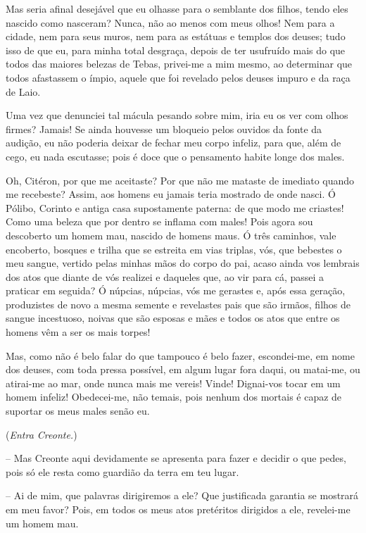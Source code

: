 Mas seria afinal desejável que eu olhasse para o semblante dos filhos,
tendo eles nascido como nasceram? Nunca, não ao menos com meus olhos!
Nem para a cidade, nem para seus muros, nem para as estátuas e templos
dos deuses; tudo isso de que eu,  para minha total desgraça,
depois de ter usufruído mais do que todos das maiores belezas de Tebas,
privei-me a mim mesmo, ao determinar que todos afastassem o ímpio,
aquele que foi revelado pelos deuses impuro e da raça de Laio.

Uma vez que denunciei tal mácula pesando sobre mim, iria eu os ver com
olhos firmes? Jamais! Se ainda houvesse um bloqueio pelos ouvidos da
fonte da audição, eu não poderia deixar de fechar meu corpo infeliz,
para que, além de cego, eu nada  escutasse; pois é doce que o
pensamento habite longe dos males.

Oh, Citéron, por que me aceitaste? Por que não me mataste de imediato
quando me recebeste? Assim, aos homens eu jamais teria mostrado de onde
nasci. Ó Pólibo, Corinto e antiga casa supostamente paterna: de que modo
me criastes! Como uma beleza que por dentro se inflama com males! Pois
agora sou descoberto um homem mau, nascido de homens maus. Ó três
caminhos, vale encoberto, bosques e trilha que  se estreita em
vias triplas, vós, que bebestes o meu sangue, vertido pelas minhas mãos
do corpo do pai, acaso ainda vos lembrais dos atos que diante de vós
realizei e daqueles que, ao vir para cá, passei a praticar em seguida? Ó
núpcias, núpcias, vós me gerastes e, após essa geração, produzistes de
novo a mesma semente e revelastes pais que são irmãos, filhos de sangue
incestuoso, noivas que são esposas e mães e todos os atos que entre os
homens vêm a ser os mais torpes!

Mas, como não é belo falar do que tampouco é belo fazer, escondei-me, em
 nome dos deuses, com toda pressa possível, em algum lugar fora
daqui, ou matai-me, ou atirai-me ao mar, onde nunca mais me vereis!
Vinde! Dignai-vos tocar em um homem infeliz! Obedecei-me, não temais,
pois nenhum dos mortais é capaz de suportar os meus males senão eu.

(\emph{Entra Creonte.})

 --   Mas Creonte aqui devidamente se apresenta para fazer e decidir o que
pedes, pois só ele resta como guardião da terra em teu lugar.

 --    Ai de mim, que palavras dirigiremos a ele? Que justificada
garantia se mostrará em meu favor? Pois, em todos os meus atos
pretéritos dirigidos a ele, revelei-me um homem mau.

